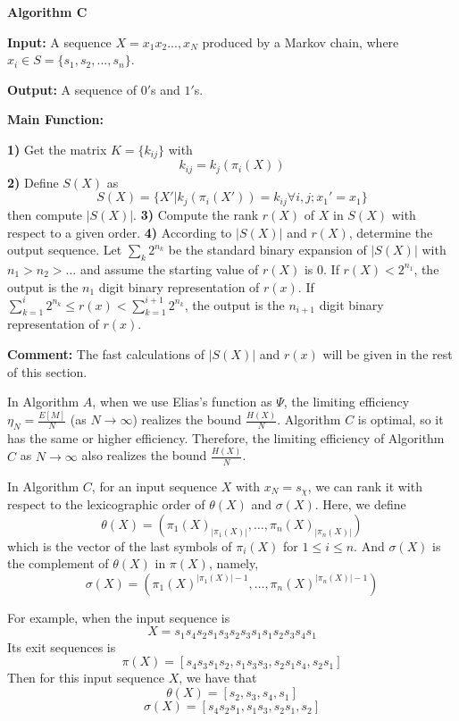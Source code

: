 \documentclass[journal]{IEEEtran}
\begin{document}
\begin{list}{}{\leftmargin=0.5em}
\renewcommand{\labelitemi}{}
  \item
  \item \textbf{Algorithm C}
  \item \textbf{Input:} A sequence $X=x_1x_2...,x_N$ produced by a Markov chain, where $x_i\in S=\{s_1,s_2,...,s_n\}$.
  \item \textbf{Output:} A sequence of $0'$s and $1'$s.
  \item \textbf{Main Function:}
\begin{algorithmic}
\STATE \textbf{1)} Get the matrix $K=\{k_{ij}\}$ with
$$k_{ij}=k_j(\pi_i(X))$$
\STATE \textbf{2)} Define $S(X)$ as
$$S(X)=\{X'| k_j(\pi_i(X'))=k_{ij} \forall i,j; x_1'=x_1\}$$
then compute $|S(X)|$.
\STATE \textbf{3)} Compute the rank $r(X)$ of $X$ in $S(X)$ with respect to a given order.
\STATE \textbf{4)} According to $|S(X)|$ and $r(X)$, determine the output sequence.
Let $\sum_{k}2^{n_k}$ be the standard binary expansion of $|S(X)|$ with $n_1>n_2>...$
and assume the
starting value of $r(X)$ is $0$. If $r(X)<2^{n_1}$, the output is the $n_1$ digit
binary representation of $r(x)$. If $\sum_{k=1}^i 2^{n_k}\leq r(x)< \sum_{k=1}^{i+1} 2^{n_k}$, the output is the $n_{i+1}$ digit
binary representation of $r(x)$.
\end{algorithmic}
\item \textbf{Comment:} The fast calculations of $|S(X)|$ and $r(x)$ will be given in the rest of this section.
\end{list}

In Algorithm $A$, when we use Elias's function as $\Psi$, the limiting efficiency $
\eta_N=\frac{E[M]}{N}$ (as $N\rightarrow\infty$) realizes the bound $\frac{H(X)}{N}$. Algorithm $C$ is optimal, so it has the same or higher efficiency.
Therefore, the limiting efficiency of Algorithm $C$ as $N\rightarrow\infty$ also realizes the bound $\frac{H(X)}{N}$.

In Algorithm $C$, for an input sequence $X$ with $x_N=s_\chi$, we can rank it with respect to the lexicographic order of $\theta(X)$ and $\sigma(X)$.
Here, we define
$$\theta(X)=(\pi_1(X)_{|\pi_1(X)|},\ldots,\pi_{n}(X)_{|\pi_{n}(X)|})$$
which is the vector of the last symbols of $\pi_i(X)$ for $1\leq i\leq n$. And
$\sigma(X)$ is the complement of $\theta(X)$ in $\pi(X)$, namely,
$$\sigma(X)=(\pi_1(X)^{|\pi_1(X)|-1},\ldots,\pi_{n}(X)^{|\pi_{n}(X)|-1})$$

For example, when the input sequence is
$$X=s_1s_4s_2s_1s_3s_2s_3s_1s_1s_2s_3s_4s_1$$
Its exit sequences is
$$\pi(X)=[s_4s_3s_1s_2,s_1s_3s_3,s_2s_1s_4,s_2s_1]$$
Then for this input sequence $X$, we have that
$$\theta(X)=[s_2,s_3,s_4,s_1]$$
$$\sigma(X)=[s_4s_2s_1,s_1s_3,s_2s_1,s_2]$$
\end{document}
